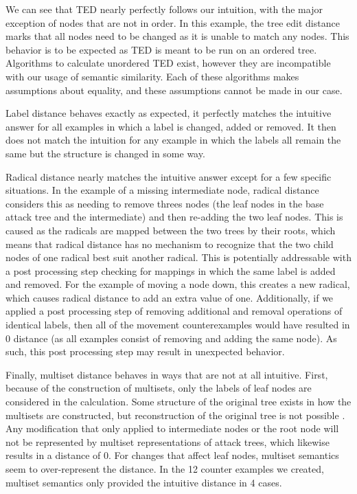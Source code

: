 We can see that TED nearly perfectly follows our intuition, with the major exception of nodes that are not in order. In this example, the tree edit distance marks that all nodes need to be changed as it is unable to match any nodes. This behavior is to be expected as TED is meant to be run on an ordered tree. Algorithms to calculate unordered TED exist, however they are incompatible with our usage of semantic similarity. Each of these algorithms makes assumptions about equality, and these assumptions cannot be made in our case.

Label distance behaves exactly as expected, it perfectly matches the intuitive answer for all examples in which a label is changed, added or removed. It then does not match the intuition for any example in which the labels all remain the same but the structure is changed in some way.

Radical distance nearly matches the intuitive answer except for a few specific situations. In the example of a missing intermediate node, radical distance considers this as needing to remove threes nodes (the leaf nodes in the base attack tree and the intermediate) and then re-adding the two leaf nodes. This is caused as the radicals are mapped between the two trees by their roots, which means that radical distance has no mechanism to recognize that the two child nodes of one radical best suit another radical. This is potentially addressable with a post processing step checking for mappings in which the same label is added and removed. For the example of moving a node down, this creates a new radical, which causes radical distance to add an extra value of one. Additionally, if we applied a post processing step of removing additional and removal operations of identical labels, then all of the movement counterexamples would have resulted in 0 distance (as all examples consist of removing and adding the same node). As such, this post processing step may result in unexpected behavior.

Finally, multiset distance behaves in ways that are not at all intuitive. First, because of the construction of multisets, only the labels of leaf nodes are considered in the calculation. Some structure of the original tree exists in how the multisets are constructed, but reconstruction of the original tree is not possible \cite{mauw_foundations_2006}. Any modification that only applied to intermediate nodes or the root node will not be represented by multiset representations of attack trees, which likewise results in a distance of 0. For changes that affect leaf nodes, multiset semantics seem to over-represent the distance. In the 12 counter examples we created, multiset semantics only provided the intuitive distance in 4 cases.











